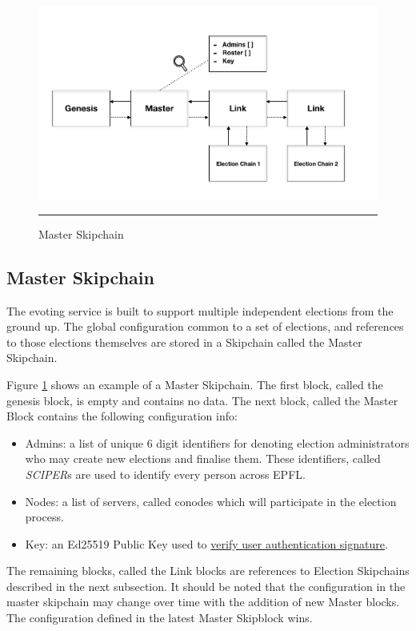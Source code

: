 \begin{figure}[ht]
  \centering
    \includegraphics[scale=0.4]{Figures/MasterSkipchain.png}
    \rule{35em}{0.5pt}
  \caption[Master Skipchain]{Master Skipchain}
  \label{fig:MasterSkipchain}
\end{figure}

\subsection{Master Skipchain}

The evoting service is built to support multiple independent elections from the ground up. The global configuration common to a set of elections, and references to those elections themselves are stored in a Skipchain called the Master Skipchain.

Figure \ref{fig:MasterSkipchain} shows an example of a Master Skipchain. The first block, called the genesis block, is empty and contains no data. The next block, called the Master Block contains the following configuration info:

\begin{itemize}
\item Admins: a list of unique 6 digit identifiers for denoting election administrators who may create new elections and finalise them. These identifiers, called \textit{SCIPER}s are used to identify every person across EPFL. 
\item Nodes: a list of servers, called conodes which will participate in the election process.
\item Key: an Ed25519 Public Key used to \hyperref[sec:auth]{verify user authentication signature}.
\end{itemize}

The remaining blocks, called the Link blocks are references to Election Skipchains described in the next subsection. It should be noted that the configuration in the master skipchain may change over time with the addition of new Master blocks. The configuration defined in the latest Master Skipblock wins.

